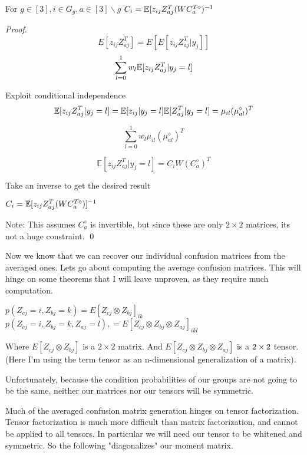 \begin{lemma}
For $g \in [3], i \in G_{g}, a \in [3]\backslash{g}$
$C_{i} = \mathbb{E}[z_{ij}Z^{T}_{aj}(WC^{T{\diamond}}_{a})^{-1}$
\begin{proof}
$$ E[z_{ij}Z^{T}_{aj}] = E[E[z_{ij}Z^{T}_{aj}| y_{j}]] $$
$$ \displaystyle\sum\limits_{l = 0}^{1} w_{l}\mathbb{E}[z_{ij}Z^{T}_{aj} | y_{j} = l]$$

Exploit conditional independence
$$ \mathbb{E}[z_{ij}Z^{T}_{aj} | y_{j} = l] =  \mathbb{E}[z_{ij} | y_{j} = l] \mathbb{E}[Z^{T}_{aj} | y_{j} = l] = \mu_{il}(\mu^{\diamond}_{al})^{T} $$


$$ \displaystyle\sum\limits_{l = 0}^{1} w_{l}\mu_{il}(\mu^{\diamond}_{al})^{T}$$

$$\mathbb{E}[z_{ij}Z^{T}_{aj} | y_{j} = l] =  C_{i}W(C^{\diamond}_{a})^{T} $$

Take an inverse to get the desired result

$C_{i} = \mathbb{E}[z_{ij}Z^{T}_{aj}(WC^{T\diamond}_{a})]^{-1}$

Note: This assumes $C^{\diamond}_{a}$ is invertible, but since these are only $2 \times 2$ matrices, its not a huge constraint.
\qed
\end{proof}
\end{lemma}

Now we know that we can recover our individual confusion matrices from the averaged ones. Lets go about computing the average confusion matrices. This will hinge on some theorems that I will leave unproven, as they require much computation.

\begin{lemma}
$p(Z_{cj} = i, Z_{bj} = k) = E[Z_{cj} \otimes Z_{bj}]_{ik}$
$p(Z_{cj} = i, Z_{bj} = k, Z_{aj} = l),  = E[Z_{cj} \otimes Z_{bj} \otimes Z_{aj}]_{ikl}$

Where $E[Z_{cj} \otimes Z_{bj}]$ is a $2 \times 2$ matrix. And $E[Z_{cj} \otimes Z_{bj} \otimes Z_{aj}]$ is a $2 \time 2 \times 2$ tensor. (Here I'm using the term tensor as an n-dimensional generalization of a matrix).
\end{lemma}

Unfortunately, because the condition probabilities of our groups are not going
to be the same, neither our matrices nor our tensors will be symmetric.

Much of the averaged confusion matrix generation hinges on tensor
factorization. Tensor factorization is much more difficult than matrix
factorization, and cannot be applied to all tensors. In particular we will need
our tensor to be whitened and symmetric. So the following "diagonalizes" our
moment matrix.

